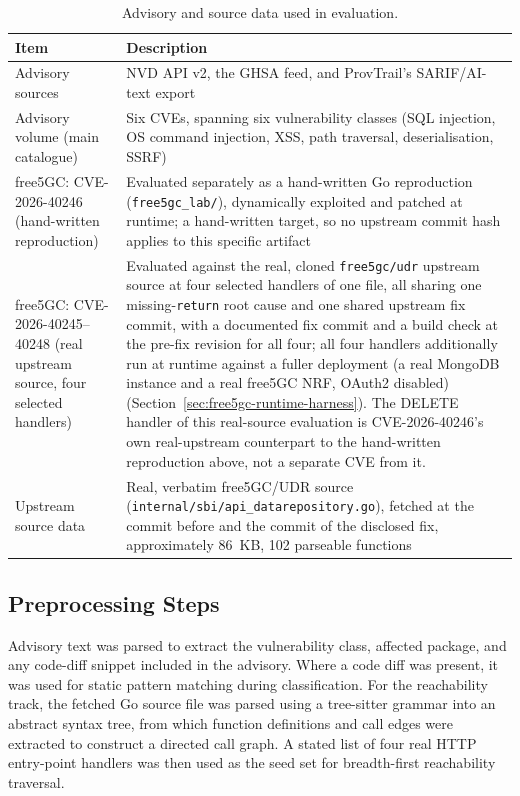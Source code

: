\documentclass[12pt,a4paper]{report}
\begin{document}
\begin{table}[H]
\centering
\caption{Advisory and source data used in evaluation.}
\begin{tabular}{@{}p{4cm}p{9cm}@{}}
\toprule
\textbf{Item} & \textbf{Description} \\
\midrule
Advisory sources & NVD API v2, the GHSA feed, and ProvTrail's SARIF/AI-text export \\
Advisory volume (main catalogue) & Six CVEs, spanning six vulnerability classes (SQL injection, OS command injection, XSS, path traversal, deserialisation, SSRF) \\
free5GC: CVE-2026-40246 (hand-written reproduction) & Evaluated separately as a hand-written Go reproduction (\texttt{free5gc\_lab/}), dynamically exploited and patched at runtime; a hand-written target, so no upstream commit hash applies to this specific artifact \\
free5GC: CVE-2026-40245--40248 (real upstream source, four selected handlers) & Evaluated against the real, cloned \texttt{free5gc/udr} upstream source at four selected handlers of one file, all sharing one missing-\texttt{return} root cause and one shared upstream fix commit, with a documented fix commit and a build check at the pre-fix revision for all four; all four handlers additionally run at runtime against a fuller deployment (a real MongoDB instance and a real free5GC NRF, OAuth2 disabled) (Section~\ref{sec:free5gc-runtime-harness}). The DELETE handler of this real-source evaluation is CVE-2026-40246's own real-upstream counterpart to the hand-written reproduction above, not a separate CVE from it. \\
Upstream source data & Real, verbatim free5GC/UDR source (\texttt{internal/\allowbreak sbi/\allowbreak api\_datarepository.go}), fetched at the commit before and the commit of the disclosed fix, approximately 86~KB, 102 parseable functions \\
\bottomrule
\end{tabular}
\end{table}

\subsection{Preprocessing Steps}

Advisory text was parsed to extract the vulnerability class, affected package, and any code-diff snippet included in the advisory. Where a code diff was present, it was used for static pattern matching during classification. For the reachability track, the fetched Go source file was parsed using a tree-sitter grammar into an abstract syntax tree, from which function definitions and call edges were extracted to construct a directed call graph. A stated list of four real HTTP entry-point handlers was then used as the seed set for breadth-first reachability traversal.
\end{document}
